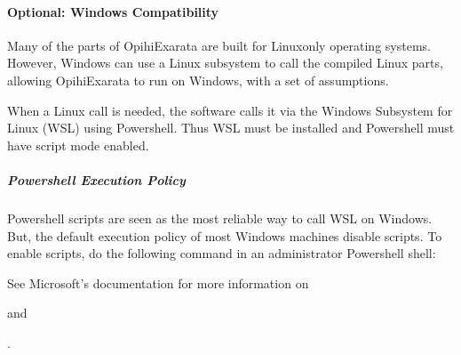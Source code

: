 \documentclass[letterpaper,11pt,english]{sphinxmanual}
\begin{document}
\sphinxstepscope


\paragraph{Optional: Windows Compatibility}
\label{\detokenize{technical/installation/windows:optional-windows-compatibility}}\label{\detokenize{technical/installation/windows:technical-installation-windows-compatibility}}\label{\detokenize{technical/installation/windows::doc}}
\sphinxAtStartPar
Many of the parts of OpihiExarata are built for Linux\sphinxhyphen{}only operating systems.
However, Windows can use a Linux subsystem to call the compiled Linux parts,
allowing OpihiExarata to run on Windows, with a set of assumptions.

\sphinxAtStartPar
When a Linux call is needed, the software calls it via the Windows Subsystem
for Linux (WSL) using Powershell. Thus WSL must be installed and Powershell
must have script mode enabled.


\subparagraph{Powershell Execution Policy}
\label{\detokenize{technical/installation/windows:powershell-execution-policy}}
\sphinxAtStartPar
Powershell scripts are seen as the most reliable way to call WSL on Windows.
But, the default execution policy of most Windows machines disable scripts. To
enable scripts, do the following command in an administrator Powershell shell:

\begin{sphinxVerbatim}[commandchars=\\\{\}]
  
\end{sphinxVerbatim}

\sphinxAtStartPar
See Microsoft’s documentation for more information on
%
\begin{footnote}[31]\sphinxAtStartFootnote
{}
%
\end{footnote} and %
\begin{footnote}[32]\sphinxAtStartFootnote
{}
%
\end{footnote}.
\end{document}
